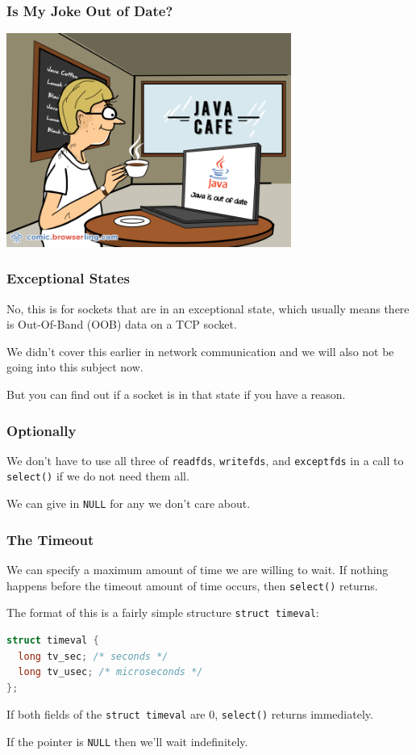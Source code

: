 \begin{frame}
	\frametitle{Is My Joke Out of Date?}

	\begin{center}
		\includegraphics[width=0.7\textwidth]{images/java-joke.png}
	\end{center}

\end{frame}

\begin{frame}
	\frametitle{Exceptional States}

	No, this is for sockets that are in an exceptional state, which usually means there is Out-Of-Band (OOB) data on a TCP socket.

	We didn't cover this earlier in network communication and we will also not be going into this subject now.

	But you can find out if a socket is in that state if you have a reason.

\end{frame}


\begin{frame}
	\frametitle{Optionally}

	We don't have to use all three of \texttt{readfds}, \texttt{writefds}, and \texttt{exceptfds} in a call to \texttt{select()} if we do not need them all.

	We can give in \texttt{NULL} for any we don't care about.

\end{frame}


\begin{frame}[fragile]
	\frametitle{The Timeout}

	We can specify a maximum amount of time we  are willing to wait. If nothing happens before the timeout amount of time occurs, then \texttt{select()} returns.

	The format of this is a fairly simple structure \texttt{struct timeval}:

	\begin{lstlisting}[language=C]
struct timeval {
  long tv_sec; /* seconds */
  long tv_usec; /* microseconds */
};
\end{lstlisting}

	If both fields of the \texttt{struct timeval} are 0, \texttt{select()} returns immediately.

	If the pointer is \texttt{NULL} then we'll wait indefinitely.
\end{frame}


